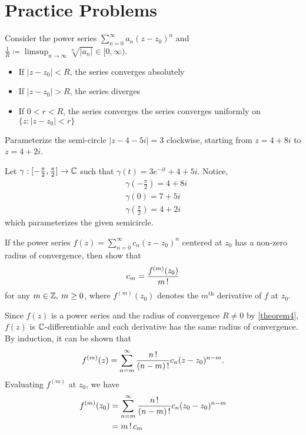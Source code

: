 \documentclass[11pt]{article}
\begin{document}
\section{Practice Problems}
\begin{remark}
	Consider the power series $\sum_{n=0}^\infty a_n(z-z_0)^n$ and $\frac{1}{R}
	\coloneqq \limsup_{n\to\infty} \sqrt[n]{|a_n|} \in [0,\infty)$.
	\begin{itemize}
		\item If $|z-z_0| < R$, the series converges absolutely
		\item If $|z-z_0| > R$, the series diverges
		\item If $0 < r < R$, the series converges the series converges
			uniformly on $\{z:|z-z_0|<r\}$
	\end{itemize}
\end{remark}
\begin{exercise}
	Parameterize the semi-circle $|z-4-5i|=3$ clockwise, starting from
$z = 4+8i$ to $z = 4+2i$.
\end{exercise}
Let $\gamma: [-\frac{\pi}{2},\frac{\pi}{2}] \to \mathbb{C}$ such that
$\gamma(t) = 3e^{-it}+4+5i$. Notice,
\begin{align*}
	&\gamma\left(-\frac{\pi}{2}\right) = 4+8i\\
	&\gamma(0) = 7+5i\\
	&\gamma\left(\frac{\pi}{2}\right)= 4+2i
\end{align*}
which parameterizes the given semicircle.
\begin{exercise}
	If the power series $f(z) = \sum^\infty_{n=0}c_n(z-z_0)^n$
	centered at $z_0$ has a non-zero radius of convergence, then
	show that
	\begin{equation*}
		c_m = \frac{f^{(m)}(z_0)}{m\operatorname{!}}
	\end{equation*}
	for any $m\in\mathbb{Z},\> m\geq 0$, where $f^{(m)}(z_0)$ denotes the
	$m^{\text{th}}$ derivative of $f$ at $z_0$.
\end{exercise}
Since $f(z)$ is a power series and the radius of convergence $R \neq
0$ by \cref{theorem4}, $f(z)$ is $\mathbb{C}$-differentiable and each
derivative has the same radius of convergence. By induction, it can
be shown that
\begin{equation*}
	f^{(m)}(z) = \sum^\infty_{n=m}\frac{n\operatorname{!}}{(n-m)\operatorname{!}}
	c_n(z-z_0)^{n-m}.
\end{equation*}
Evaluating $f^{(m)}$ at $z_0$, we have
\begin{align*}
	f^{(m)}(z_0) &= \sum^\infty_{n=m}\frac{n\operatorname{!}}{(n-m)\operatorname{!}}
	c_n(z_0-z_0)^{n-m}\\
	&= m\operatorname{!} c_m
\end{align*}
\end{document}
